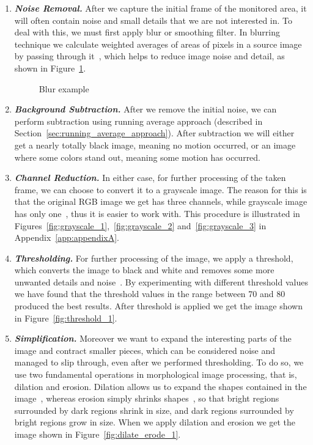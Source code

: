 	\begin{enumerate}
	\item \textit{\textbf{Noise Removal.}} After we capture the initial frame of the monitored area, it will often contain noise and small details that we are not interested in. To deal with this, we must first apply blur or smoothing filter. In blurring technique we calculate weighted averages of areas of pixels in a source image by passing through it~\cite{blur_1}, which helps to reduce image noise and detail, as shown in Figure~\ref{fig:blur_example}.
	\begin{figure}[htb]
		\centering
		\quad
		\caption{Blur example}
		\label{fig:blur_example}
	\end{figure}
	
	\item \textit{\textbf{Background Subtraction.}} After we remove the initial noise, we can perform subtraction using running average approach (described in Section~\ref{sec:running_average_approach}). After subtraction we will either get a nearly totally black image, meaning no motion occurred, or an image where some colors stand out, meaning some motion has occurred. 
	
	\item \textit{\textbf{Channel Reduction.}} In either case, for further processing of the taken frame, we can choose to convert it to a grayscale image. The reason for this is that the original RGB image we get has three channels, while grayscale image has only one~\cite{grayscale_1}, thus it is easier to work with. This procedure is illustrated in Figures~\ref{fig:grayscale_1},~\ref{fig:grayscale_2} and~\ref{fig:grayscale_3} in Appendix~\ref{app:appendixA}. 
	
	\item \textit{\textbf{Thresholding.}} For further processing of the image, we apply a threshold, which converts the image to black and white and removes some more unwanted details and noise~\cite{threshold_1}. By experimenting with different threshold values we have found that the threshold values in the range between 70 and 80 produced the best results. After threshold is applied we get the image shown in Figure~\ref{fig:threshold_1}. 
	
	\item \textit{\textbf{Simplification.}} Moreover we want to expand the interesting parts of the image and contract smaller pieces, which can be considered noise and managed to slip through, even after we performed thresholding. To do so, we use two fundamental operations in morphological image processing, that is, dilation and erosion. Dilation allows us to expand the shapes contained in the image~\cite{dilation_1}, whereas erosion simply shrinks shapes~\cite{erosion_1}, so that bright regions surrounded by dark regions shrink in size, and dark regions surrounded by bright regions grow in size. When we apply dilation and erosion we get the image shown in Figure~\ref{fig:dilate_erode_1}. 
	

\end{enumerate}
